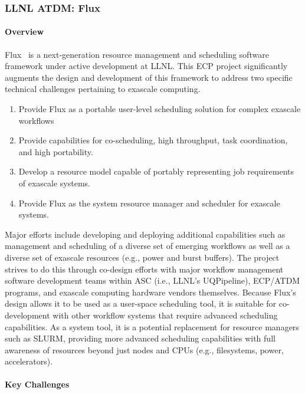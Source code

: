 \subsubsection{ LLNL ATDM: Flux}

\paragraph{Overview}

Flux~\cite{Ahn:2014:Flux,FluxSC18} is a next-generation resource
management and scheduling software framework under active development at
LLNL. This ECP project significantly augments the design and development
of this framework to address two specific technical challenges pertaining
to exascale computing.

\begin{enumerate}
\item Provide Flux as a portable user-level scheduling solution for complex
      exascale workflows

\item Provide capabilities for co-scheduling, high throughput, task
      coordination, and high portability.

\item Develop a resource model capable of portably representing job
      requirements of exascale systems.

\item Provide Flux as the system resource manager and scheduler for exascale
      systems.
\end{enumerate}

Major efforts include developing and deploying additional capabilities
such as management and scheduling of a diverse set of emerging workflows
as well as a diverse set of exascale resources (e.g., power and burst
buffers). The project strives to do this through co-design efforts with
major workflow management software development teams within ASC (i.e.,
LLNL’s UQPipeline), ECP/ATDM programs, and exascale computing hardware
vendors themselves. Because Flux’s design allows it to be used as a
user-space scheduling tool, it is suitable for co-development with other
workflow systems that require advanced scheduling capabilities. As a
system tool, it is a potential replacement for resource managers such as
SLURM, providing more advanced scheduling capabilities with full
awareness of resources beyond just nodes and CPUs (e.g., filesystems,
power, accelerators).


\paragraph{Key Challenges}

